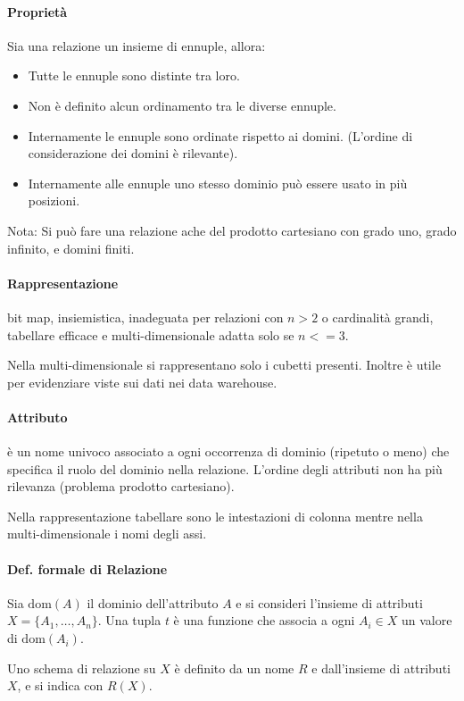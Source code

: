 \paragraph{Proprietà} Sia una relazione un insieme di ennuple, allora:
\begin{itemize}
	\item Tutte le ennuple sono distinte tra loro.
	\item Non è definito alcun ordinamento tra le diverse ennuple.
	\item Internamente le ennuple sono ordinate rispetto ai domini. (L'ordine di considerazione dei domini è rilevante).
	\item Internamente alle ennuple uno stesso dominio può essere usato in più posizioni.
\end{itemize}
Nota: Si può fare una relazione ache del prodotto cartesiano con grado uno, grado infinito, e domini finiti.
\paragraph{Rappresentazione} bit map, insiemistica, inadeguata per relazioni con $n>2$ o cardinalità grandi, tabellare efficace e multi-dimensionale adatta solo se $n<=3$.

Nella multi-dimensionale si rappresentano solo i cubetti presenti. Inoltre è utile per evidenziare viste sui dati nei data warehouse.

\paragraph{Attributo} è un nome univoco associato a ogni occorrenza di dominio (ripetuto o meno) che specifica il ruolo del dominio nella relazione.
L'ordine degli attributi non ha più rilevanza (problema prodotto cartesiano).

Nella rappresentazione tabellare sono le intestazioni di colonna mentre nella multi-dimensionale i nomi degli assi.

\paragraph{Def. formale di Relazione} Sia $\mathrm{dom}(A)$ il dominio dell'attributo $A$ e si consideri l'insieme di attributi $X=\{A_1,\dots,A_n\}$. Una tupla $t$ è una funzione che associa a ogni $A_i\in X$ un valore di $\mathrm{dom}(A_i)$.

Uno schema di relazione su $X$ è definito da un nome $R$ e dall'insieme di attributi $X$, e si indica con $R(X)$.

